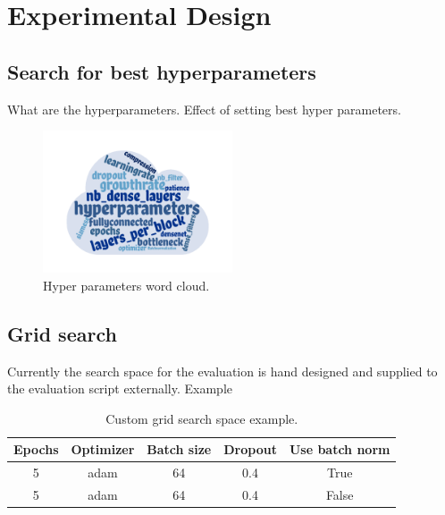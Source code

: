 \section{Experimental Design}

\subsection{Search for best hyperparameters}
What are the hyperparameters.
Effect of setting best hyper parameters.

\begin{figure}[ht]
\centering
\includegraphics[width=0.5\textwidth]{images/densenet/wordcloud_hyperparameters.png}
\caption{\label{fig:wordcloud_hp}Hyper parameters word cloud.}
\end{figure}

\subsection{Grid search}
Currently the search space for the evaluation is hand designed and supplied to the evaluation script externally. Example

\begin{table}
\centering
    \begin{tabular}{|c c c c c|} 
      \hline\hline
      Epochs & Optimizer & Batch size & Dropout & Use batch norm\\[0.5ex] 
      \hline
      5 & adam & 64 & 0.4 & True \\  
      \hline
      5 & adam & 64 & 0.4 & False \\ 
      \hline \hline
    \end{tabular}
  \caption{Custom grid search space example.}
  \label{table:grid_example}
\end{table}

